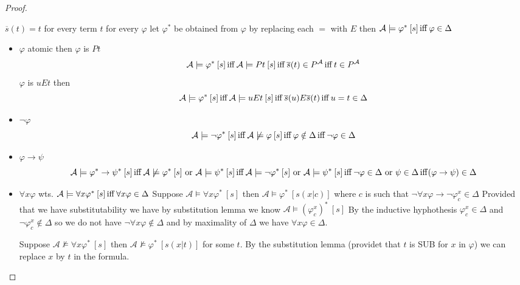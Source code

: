 \begin{proof}
\begin{enumerate}
         $\overline{s}(t) = t$ for every term $t$
         for every $\varphi$ let $\varphi^*$ be obtained from $\varphi$ by replacing each $=$ with $E$ then $\mathcal{A}\models \varphi^* \: [s] \operatorname{iff} \varphi \in \Delta$
        \begin{claimproof}
            \begin{itemize}
                \item $\varphi$ atomic then $\varphi$ is $Pt$\\
                \[\mathcal{A}\models \varphi^* \: [s] \operatorname{iff} \mathcal{A}\models Pt \: [s] \operatorname{iff} \overline{s}(t)\in P^\mathcal{A} \operatorname{iff} t\in P^\mathcal{A}\]
                $\varphi$ is $uEt$ then
                \[\mathcal{A}\models \varphi^* \: [s] \operatorname{iff} \mathcal{A}\models uEt \: [s] \operatorname{iff} \overline{s}(u)E\overline{s}(t)\operatorname{iff} u=t\in \Delta\]
                \item $\lnot \varphi$
                \[\mathcal{A}\models \lnot\varphi^* \: [s] \operatorname{iff} \mathcal{A}\not\models \varphi \: [s] \operatorname{iff} \varphi\notin \Delta \operatorname{iff} \lnot \varphi \in \Delta\]
                \item $\varphi \to \psi$
                \[\mathcal{A}\models \varphi^*\to \psi^* \: [s] \operatorname{iff} \mathcal{A}\not\models \varphi^* \: [s] \text{ or }\mathcal{A}\models \psi^* \: [s] \operatorname{iff} \mathcal{A}\models \lnot \varphi^* \: [s] \text{ or }\mathcal{A}\models \psi^* \: [s] \operatorname{iff} \lnot \varphi \in \Delta \text{ or } \psi\in \Delta \operatorname{iff} (\varphi \to \psi)\in \Delta\]
                \item $\forall x \varphi$
                wts. $\mathcal{A}\models \forall x \varphi^* \: [s] \operatorname{iff} \forall x \varphi \in \Delta$
                Suppose $\mathcal{A}\models \forall x \varphi^* \: [s]$ then $\mathcal{A}\models \varphi^* \: [s(x|c)]$ where $c$ is such that $\lnot \forall x \varphi \to \lnot \varphi^x_c\in \Delta$
                Provided that we have substitutability we have by substitution lemma %
                we know $\mathcal{A} \models (\varphi^x_c)^*\: [s]$
                By the inductive hyphothesis $\varphi^x_c\in \Delta$ and $\lnot\varphi_c^x\notin \Delta$ 
                so we do not have $\lnot \forall x \varphi\notin \Delta$ and by maximality of $\Delta$ we have 
                $ \forall x \varphi \in \Delta$.

                Suppose $\mathcal{A}\not\models \forall x \varphi^* \: [s]$ then $\mathcal{A}\not\models \varphi^* \: [s(x|t)]$ for some $t$. By the substitution lemma (providet that $t$ is SUB for $x$ in $\varphi$) we can replace $x$ by $t$ in the formula.


\end{itemize}
\end{claimproof}
\end{enumerate}
\end{proof}
